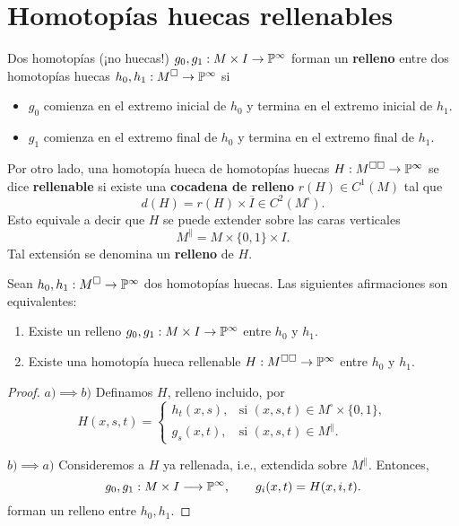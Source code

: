 \section{Homotopías huecas rellenables}

Dos homotopías (¡no huecas!) $g_0, g_1 : M \times I \to \P^\infty$ forman un \textbf{relleno} entre dos homotopías huecas $h_0, h_1 : M^\square \to \P^\infty$ si\begin{itemize}
    \itemsep 0em
    \item $g_0$ comienza en el extremo inicial de $h_0$ y termina en el extremo inicial de $h_1$.
    \item $g_1$ comienza en el extremo final de $h_0$ y termina en el extremo final de $h_1$.
\end{itemize}
Por otro lado, una homotopía hueca de homotopías huecas $H : M^{\square \square} \to \P^\infty$ se dice \textbf{rellenable} si existe una \textbf{cocadena de relleno} $r(H) \in C^1(M)$ tal que
$$d(H) = r(H) \times \overline I \in C^2(M^\square).$$
Esto equivale a decir que $H$ se puede extender sobre las caras verticales
$$M^\parallel = M \times \{ 0, 1 \} \times I.$$
Tal extensión se denomina un \textbf{relleno} de $H$.

\begin{proposition}
Sean $h_0, h_1 : M^\square \to \P^\infty$ dos homotopías huecas. Las siguientes afirmaciones son equivalentes:
\begin{enumerate}[label=\alph*)]
    \itemsep 0em
    \item Existe un relleno $g_0, g_1 : M \times I \to \P^\infty$ entre $h_0$ y $h_1$.
    \item Existe una homotopía hueca rellenable $H : M^{\square \square} \to \P^\infty$ entre $h_0$ y $h_1$.
\end{enumerate}
\end{proposition}

\begin{proof}
$a) \implies b)$ Definamos $H$, relleno incluido, por
$$
H(x,s,t) =
  \begin{cases}
    h_t(x,s), & \text{si } (x,s,t) \in M^\square \times \{ 0, 1 \}, \\
    g_s(x,t), & \text{si } (x,s,t) \in M^\parallel.
  \end{cases}
$$

$b) \implies a)$ Consideremos a $H$ ya rellenada, i.e., extendida sobre $M^\parallel$. Entonces,
$$g_0, g_1 : M \times I \longrightarrow \P^\infty, \qquad g_i(x,t) = H(x,i,t).$$
forman un relleno entre $h_0, h_1$.
\end{proof}

